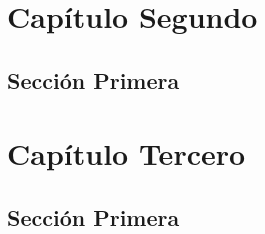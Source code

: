 \documentclass[12pt]{book}
\begin{document}
%



\frontmatter


\mainmatter
\printnoidxglossaries
    

    

    \chapter{Capítulo Segundo}
        \section{Sección Primera}
            \lipsum[9-20]

    \chapter{Capítulo Tercero}
        \section{Sección Primera}
            \lipsum[9-12]

    

    
    
    

    
\end{document}
